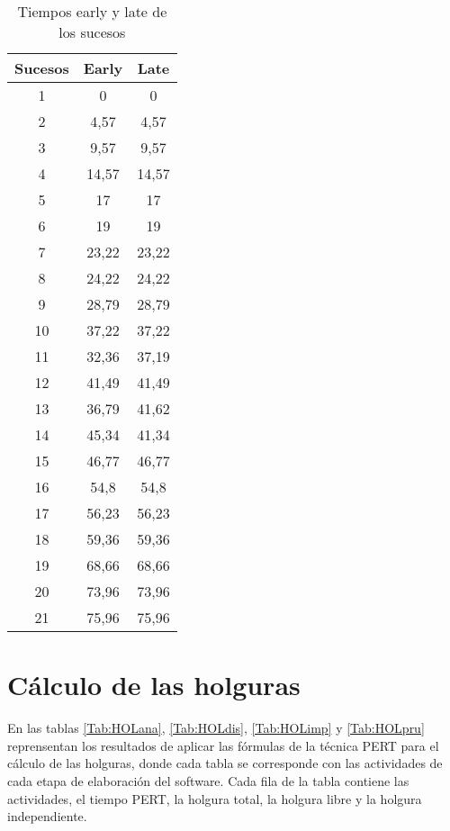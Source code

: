 \documentclass[11pt,a4paper,spanish,twoside]{report}
\begin{document}
\begin{table}[!h]
\centering
  \begin{tabular}{|c c c|}
    \hline
    \textbf{Sucesos} & \textbf{Early} & \textbf{Late} \\
    \hline \hline
    1  & 0     & 0     \\
    \hline
    2  & 4,57  & 4,57  \\
    \hline
    3  & 9,57  & 9,57  \\
    \hline
    4  & 14,57 & 14,57 \\
    \hline
    5  & 17    & 17    \\
    \hline
    6  & 19    & 19    \\
    \hline
    7  & 23,22 & 23,22 \\
    \hline
    8  & 24,22 & 24,22 \\
    \hline
    9  & 28,79 & 28,79 \\
    \hline
    10 & 37,22 & 37,22 \\
    \hline
    11 & 32,36 & 37,19 \\
    \hline
    12 & 41,49 & 41,49 \\
    \hline
    13 & 36,79 & 41,62 \\
    \hline
    14 & 45,34 & 41,34 \\
    \hline
    15 & 46,77 & 46,77 \\
    \hline
    16 & 54,8  & 54,8  \\
    \hline
    17 & 56,23 & 56,23 \\
    \hline
    18 & 59,36 & 59,36 \\
    \hline
    19 & 68,66 & 68,66 \\
    \hline
    20 & 73,96 & 73,96 \\
    \hline
    21 & 75,96 & 75,96 \\
    \hline
  \end{tabular}
  \caption{Tiempos early y late de los sucesos}
  \label{Tab:tearly}
\end{table}

\section{Cálculo de las holguras}
En las tablas \ref{Tab:HOLana}, \ref{Tab:HOLdis}, \ref{Tab:HOLimp} y
\ref{Tab:HOLpru} reprensentan los resultados de aplicar las fórmulas de la
técnica PERT para el cálculo de las holguras, donde cada tabla se corresponde
con las actividades de cada etapa de elaboración del software. Cada fila de la
tabla contiene las actividades, el tiempo PERT, la holgura total, la holgura
libre y la holgura independiente.
\end{document}
